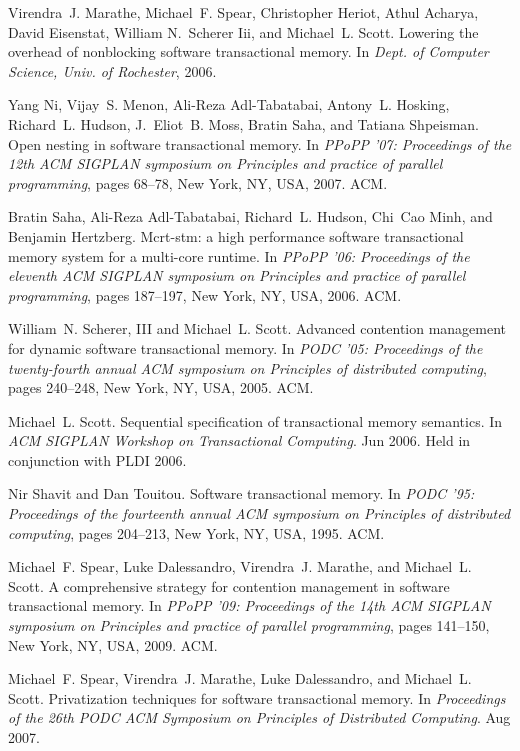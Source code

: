 \begin{thebibliography}{99}
{
Virendra~J. Marathe, Michael~F. Spear, Christopher Heriot, Athul Acharya, David
  Eisenstat, William N.~Scherer Iii, and Michael~L. Scott.
\newblock Lowering the overhead of nonblocking software transactional memory.
\newblock In {\em Dept. of Computer Science, Univ. of Rochester}, 2006.

Yang Ni, Vijay~S. Menon, Ali-Reza Adl-Tabatabai, Antony~L. Hosking, Richard~L.
  Hudson, J.~Eliot~B. Moss, Bratin Saha, and Tatiana Shpeisman.
\newblock Open nesting in software transactional memory.
\newblock In {\em PPoPP '07: Proceedings of the 12th ACM SIGPLAN symposium on
  Principles and practice of parallel programming}, pages 68--78, New York, NY,
  USA, 2007. ACM.

Bratin Saha, Ali-Reza Adl-Tabatabai, Richard~L. Hudson, Chi~Cao Minh, and
  Benjamin Hertzberg.
\newblock Mcrt-stm: a high performance software transactional memory system for
  a multi-core runtime.
\newblock In {\em PPoPP '06: Proceedings of the eleventh ACM SIGPLAN symposium
  on Principles and practice of parallel programming}, pages 187--197, New
  York, NY, USA, 2006. ACM.

William~N. Scherer, III and Michael~L. Scott.
\newblock Advanced contention management for dynamic software transactional
  memory.
\newblock In {\em PODC '05: Proceedings of the twenty-fourth annual ACM
  symposium on Principles of distributed computing}, pages 240--248, New York,
  NY, USA, 2005. ACM.

Michael~L. Scott.
\newblock Sequential specification of transactional memory semantics.
\newblock In {\em ACM SIGPLAN Workshop on Transactional Computing}. Jun 2006.
\newblock Held in conjunction with PLDI 2006.

Nir Shavit and Dan Touitou.
\newblock Software transactional memory.
\newblock In {\em PODC '95: Proceedings of the fourteenth annual ACM symposium
  on Principles of distributed computing}, pages 204--213, New York, NY, USA,
  1995. ACM.

Michael~F. Spear, Luke Dalessandro, Virendra~J. Marathe, and Michael~L. Scott.
\newblock A comprehensive strategy for contention management in software
  transactional memory.
\newblock In {\em PPoPP '09: Proceedings of the 14th ACM SIGPLAN symposium on
  Principles and practice of parallel programming}, pages 141--150, New York,
  NY, USA, 2009. ACM.

Michael~F. Spear, Virendra~J. Marathe, Luke Dalessandro, and Michael~L. Scott.
\newblock Privatization techniques for software transactional memory.
\newblock In {\em Proceedings of the 26th PODC ACM Symposium on Principles of
  Distributed Computing}. Aug 2007.














}
\end{thebibliography}
